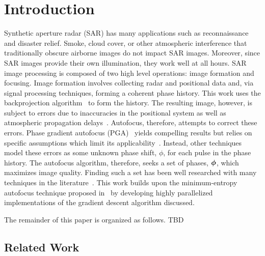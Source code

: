 \section{Introduction}\label{sec:introduction}

Synthetic aperture radar (SAR) has many applications such as reconnaissance and
disaster relief. Smoke, cloud cover, or other atmospheric interference that
traditionally obscure airborne images do not impact SAR images. Moreover, since
SAR images provide their own illumination, they work well at all hours.  SAR
image processing is composed of two high level operations: image formation and
focusing. Image formation involves collecting radar and positional data and, via
signal processing techniques, forming a coherent phase history.  This work
uses the backprojection algorithm~\cite{bp} to form the history. The resulting
image, however, is subject to errors due to inaccuracies in the positional
system as well as atmospheric propagation delays~\cite{ash2012autofocus}.
Autofocus, therefore, attempts to correct these errors. Phase gradient autofocus
(PGA)~\cite{wahl1994phase} yields compelling results but relies on specific
assumptions which limit its applicability~\cite{ash2012autofocus}. Instead,
other techniques model these errors as some unknown phase shift,
$\phi$, for each pulse in the phase history.  The autofocus algorithm,
therefore, seeks a set of phases, $\bm{\phi}$, which maximizes image quality.
Finding such a set has been well researched with many techniques in the
literature~\cite{kragh2006monotonic, ash2012autofocus, kragh2009minimum,
morrison2007sar, Eichel:89, less_mem_high_eff_autofocus}.  This work builds upon
the minimum-entropy autofocus technique proposed in~\cite{kragh2006monotonic} by
developing highly parallelized implementations of the gradient descent algorithm
discussed.

The remainder of this paper is organized as follows. TBD

\subsection{Related Work}

